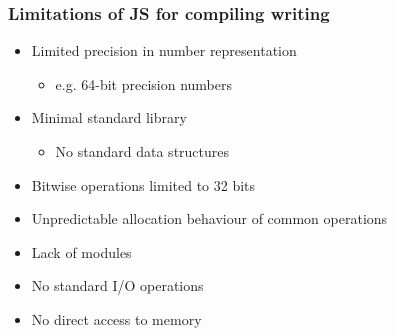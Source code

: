 % 

% 

\begin{frame}
\frametitle{\bf Limitations of JS for compiling writing}

    \begin{itemize}
        \item Limited precision in number representation
        \begin{itemize}
            \item e.g. 64-bit precision numbers
        \end{itemize}
        \item Minimal standard library
        \begin{itemize}
            \item No standard data structures
        \end{itemize}
        \item Bitwise operations limited to 32 bits
        \item Unpredictable allocation behaviour of common operations
        \item Lack of modules
        \item No standard I/O operations
        \item No direct access to memory
    \end{itemize}
\end{frame}

% 

